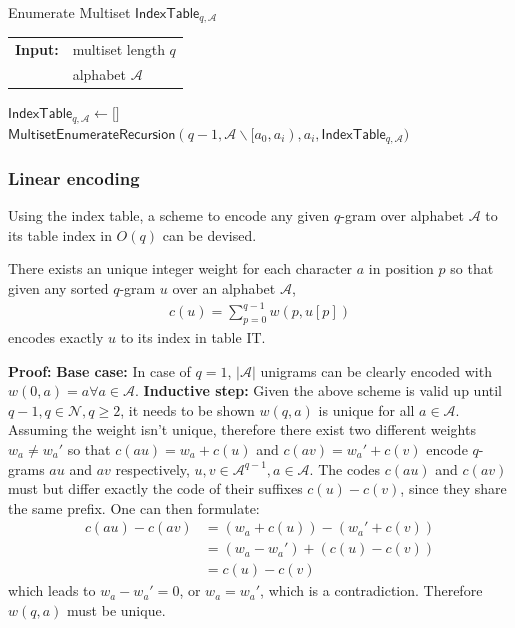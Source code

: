 \documentclass[twoside,a4paper,bsc]{master}
\newcommand{\Qgram}[1]{\(#1\)-gram}
\newcommand{\IT}[2]{\mathsf{IndexTable}_{#1,#2}}
\newcommand{\Alpha}[0]{\mathcal{A}}
\newcommand{\Skiptheorem}{\smallskipamount}
\newcommand{\StartFormal}[1]{\par\addvspace{\Skiptheorem}\noindent\textbf{#1}}
\newcommand{\EndFormal}{\par\addvspace{\Skiptheorem}}
\newenvironment{Proof}{\StartFormal{Proof:}}{\EndFormal}
\begin{document}
\begin{algorithm}[t]
\caption{Enumerate Multiset \(\IT{q}{\Alpha}\)}
\label{code:enumerateMultiset}
\begin{tabular}{@{}l@{~}l}
\textbf{Input:}&multiset length \(q\)\\
&alphabet \(\Alpha\)
\end{tabular}
\begin{algorithmic}
\State \(\IT{q}{\Alpha}\gets \lbrack \rbrack\)
\For{\(a_i \in \Alpha\)}
\State \(\mathsf{MultisetEnumerateRecursion}(q-1,\Alpha \backslash
[a_0,a_i),a_i,\IT{q}{\Alpha})\)
\EndFor
\end{algorithmic}
\end{algorithm}
\subsubsection{Linear encoding}
Using the index table, a scheme to encode any given \Qgram{q} over
alphabet \(\Alpha\) to its table index in \(O(q)\) can be devised.
\begin{Lemma}
\label{linearEncodingProof}
There exists an unique integer weight for each character \(a\) in position
\(p\) so that given any sorted \Qgram{q} \(u\) over an alphabet
\(\Alpha\),
\begin{align}
c(u)=\sum_{p=0}^{q-1} w(p,u[p])\label{Equation:linearenc}
\end{align}
encodes exactly \(u\) to its index in table IT.
\begin{Proof}
\textbf{Base case:} In case of \(q=1\), \(|\Alpha|\) unigrams can be
clearly encoded with \(w(0,a) = a \forall a \in \Alpha\).
\textbf{Inductive step:} Given the above scheme is valid up until \(q-1,
q\in \mathcal{N},q\geq 2\), it needs to be shown \(w(q,a)\) is unique for
all \(a\in \Alpha\). Assuming the weight isn't unique, therefore there
exist two different weights \(w_a\neq w_a'\) so that \(c(au) = w_a + c(u)\)
and \(c(av) = w_a' + c(v)\) encode \Qgram{q}s \(au\) and \(av\)
respectively, \(u,v\in \Alpha^{q-1},a\in\Alpha\). The codes \(c(au)\) and
\(c(av)\) must but differ exactly the code of their suffixes \(c(u)-c(v)\),
since they share the same prefix. One can then formulate:
\begin{align}
c(au) - c(av) &= (w_a + c(u)) - (w_a' + c(v))\\
&= (w_a - w_a') + (c(u) - c(v))\\
&= c(u) - c(v)
\end{align}
which leads to \(w_a - w_a' = 0\), or \(w_a = w_a'\), which is a
contradiction. Therefore \(w(q,a)\) must be unique.
\end{Proof}
\end{Lemma}
\end{document}
